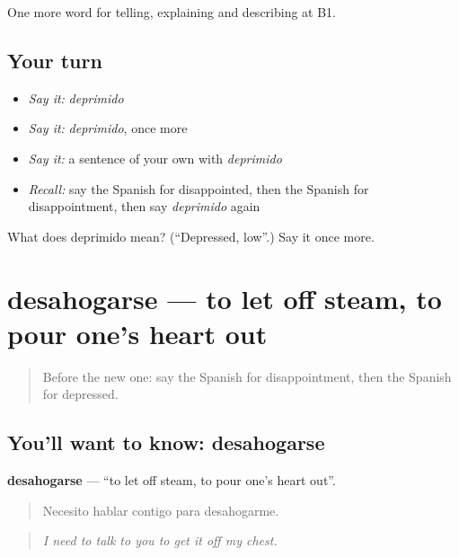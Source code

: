 \begin{grammarlens}[title={What you've built}]
One more word for telling, explaining and describing at B1.
\end{grammarlens}

\subsection*{Your turn}
\begin{itemize}
\raggedright
  \item \emph{Say it:} \emph{deprimido}
  \item \emph{Say it:} \emph{deprimido}, once more
  \item \emph{Say it:} a sentence of your own with \emph{deprimido}
  \item \emph{Recall:} say the Spanish for disappointed, then the Spanish for disappointment, then say \emph{deprimido} again
\end{itemize}

\begin{tcolorbox}[breakable,colback=teal!4,colframe=teal!35!black,title={Before you move on}]
What does deprimido mean? (\textquotedblleft{}Depressed, low\textquotedblright{}.) Say it once more.
\end{tcolorbox}
\section[desahogarse]{desahogarse — to let off steam, to pour one's heart out}

\label{lesson:ES-C717-desahogarse}



\begin{quote}
Before the new one: say the Spanish for disappointment, then the Spanish for depressed.
\end{quote}

\subsection*{You'll want to know: desahogarse}
\textbf{desahogarse} — \textquotedblleft{}to let off steam, to pour one's heart out\textquotedblright{}.

\begin{quote}
Necesito hablar contigo para desahogarme.
\end{quote}

\begin{quote}
\emph{I need to talk to you to get it off my chest.}
\end{quote}

